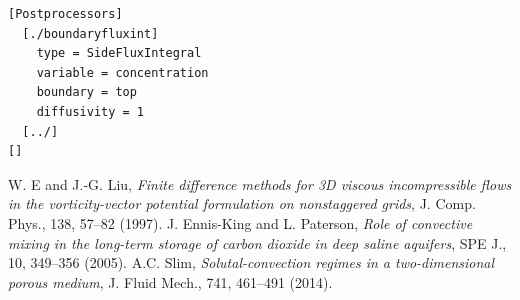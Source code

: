 \documentclass[11pt, a4paper]{csiroreport2012}
\begin{document}
\begin{shaded}
\begin{verbatim}
[Postprocessors]
  [./boundaryfluxint]
    type = SideFluxIntegral
    variable = concentration
    boundary = top
    diffusivity = 1
  [../]
[]
\end{verbatim}
\end{shaded}

\clearpage

%
\begin{thebibliography}{9}
W. E and J.-G. Liu, \emph{Finite difference methods for 3D viscous incompressible flows in the vorticity-vector potential formulation on nonstaggered grids}, J. Comp. Phys., 138, 57--82 (1997).
J. Ennis-King and L. Paterson,  \emph{Role of convective mixing in the long-term storage of carbon dioxide in deep saline aquifers}, SPE J., 10, 349--356 (2005).
A.C. Slim,  \emph{Solutal-convection regimes in a two-dimensional porous medium}, J. Fluid Mech., 741, 461--491 (2014).
\end{thebibliography}
\end{document}
